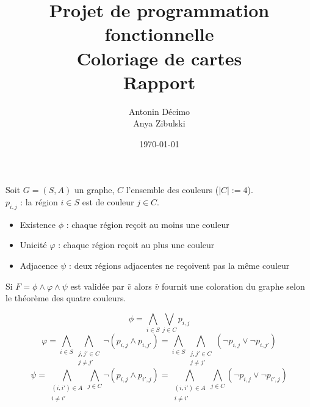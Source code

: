 \documentclass{article}
\begin{document}
\title{Projet de programmation fonctionnelle\\
Coloriage de cartes\\
Rapport}
\author{Antonin Décimo\\ Anya Zibulski}
\date{\today}
\maketitle

Soit $G = (S, A)$ un graphe, $C$ l'ensemble des couleurs ($|C| := 4$). \\
$p_{i, j}$ : la région $i \in S$ est de couleur $j \in C$.
\begin{itemize}
    \item Existence $\phi$ : chaque région reçoit au moins une couleur
    \item Unicité $\varphi$ : chaque région reçoit au plus une couleur
    \item Adjacence $\psi$ : deux régions adjacentes ne reçoivent pas la même couleur
\end{itemize}
Si $F = \phi \land \varphi \land \psi$ est validée par $\bar{v}$ alors $\bar{v}$
fournit une coloration du graphe selon le théorème des quatre couleurs.

$$\phi = \displaystyle\bigwedge_{i \in S}\displaystyle\bigvee_{j \in C} p_{i, j}$$
$$\varphi
  = \displaystyle\bigwedge_{i \in S}
    \bigwedge_{\substack{j, j' \in C \\
    j \neq j'}}
    \neg(p_{i,j} \land p_{i, j'})
  = \displaystyle\bigwedge_{i \in S}
    \bigwedge_{\substack{j, j' \in C \\
    j \neq j'}}
    (\neg p_{i,j} \lor \neg p_{i, j'})$$
$$\psi
  = \bigwedge_{\substack{(i, i') \in A \\
    i \neq i'}}
    \displaystyle\bigwedge_{j \in C}
    \neg(p_{i,j} \land p_{i', j})
  = \bigwedge_{\substack{(i, i') \in A \\
    i \neq i'}}
    \displaystyle\bigwedge_{j \in C}
    (\neg p_{i,j} \lor \neg p_{i', j})
    $$
\end{document}
